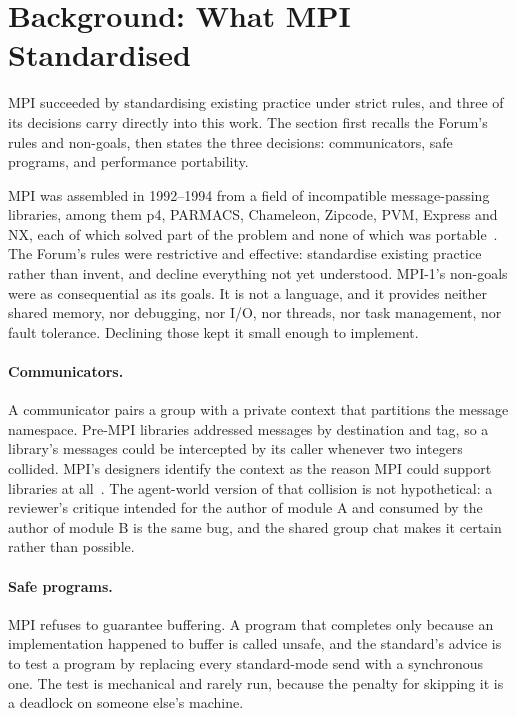\documentclass[sigconf,nonacm]{acmart}
\begin{document}
\section{Background: What MPI Standardised}
\label{sec:background}

MPI succeeded by standardising existing practice under strict rules, and three
of its decisions carry directly into this work. The section first recalls the
Forum's rules and non-goals, then states the three decisions: communicators,
safe programs, and performance portability.

MPI was assembled in 1992--1994 from a field of incompatible message-passing
libraries, among them p4, PARMACS, Chameleon, Zipcode, PVM, Express and NX, each
of which solved part of the problem and none of which was
portable~\cite{walker1992standards,dongarra1993proposal,mpiforum1994mpi10,gropp1993chameleon}.
The Forum's rules were restrictive and effective: standardise existing practice
rather than invent, and decline everything not yet understood. MPI-1's non-goals
were as consequential as its goals. It is not a language, and it provides neither
shared memory, nor debugging, nor I/O, nor threads, nor task management, nor
fault tolerance. Declining those kept it small enough to implement.

\paragraph{Communicators.} A communicator pairs a group with a private context
that partitions the message namespace. Pre-MPI libraries addressed messages by
destination and tag, so a library's messages could be intercepted by its caller
whenever two integers collided. MPI's designers identify the context as the
reason MPI could support libraries at
all~\cite{gropp2001learning,hoefler2011libraries,snir1996mpicomplete}. The
agent-world version of that collision is not hypothetical: a reviewer's critique
intended for the author of module A and consumed by the author of module B is the
same bug, and the shared group chat makes it certain rather than possible.

\paragraph{Safe programs.} MPI refuses to guarantee buffering. A program that
completes only because an implementation happened to buffer is called unsafe, and
the standard's advice is to test a program by replacing every standard-mode send
with a synchronous one. The test is mechanical and rarely run, because the
penalty for skipping it is a deadlock on someone else's machine.
\end{document}
